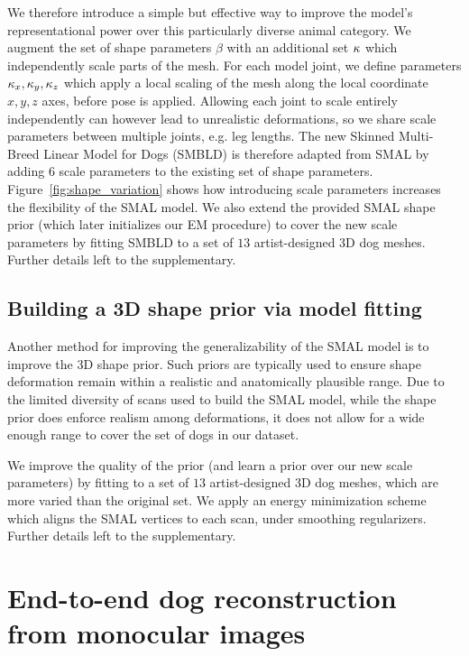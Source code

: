 We therefore introduce a simple but effective way to improve the model's representational power over this particularly diverse  animal category. We augment the set of shape parameters $\beta$ with an additional set $\kappa$ which independently scale parts of the mesh. For each model joint, we define parameters ${\kappa_x,\kappa_y,\kappa_z}$ which apply a local scaling of the mesh along the local coordinate $x, y, z$ axes, before pose is applied. Allowing each joint to scale entirely independently can however lead to unrealistic deformations, so we share scale parameters between multiple joints, e.g. leg lengths. The new Skinned Multi-Breed Linear Model for Dogs (SMBLD) is therefore adapted from SMAL by adding $6$ scale parameters to the existing set of shape parameters. Figure~\ref{fig:shape_variation} shows how introducing scale parameters increases the flexibility of the SMAL model. We also extend the provided SMAL shape prior (which later initializes our EM procedure) to cover the new scale parameters by fitting SMBLD to a set of $13$ artist-designed 3D dog meshes. Further details left to the supplementary.



\subsection{Building a 3D shape prior via model fitting}

Another method for improving the generalizability of the SMAL model is to improve the 3D shape prior. Such priors are typically used to ensure shape deformation remain within a realistic and anatomically plausible range. Due to the limited diversity of scans used to build the SMAL model, while the shape prior does enforce realism among deformations, it does not allow for a wide enough range to cover the set of dogs in our dataset.

We improve the quality of the prior (and learn a prior over our new scale parameters) by fitting to a set of $13$ artist-designed 3D dog meshes, which are more varied than the original set. We apply an energy minimization scheme which aligns the SMAL vertices to each scan, under smoothing regularizers. Further details left to the supplementary.


\section{End-to-end dog reconstruction from monocular images} 

